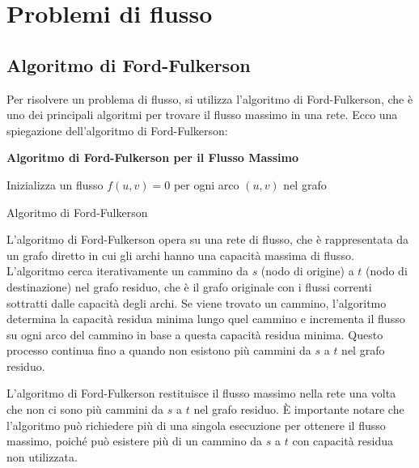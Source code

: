 \chapter{Problemi di flusso}
\section{Algoritmo di Ford-Fulkerson}

Per risolvere un problema di flusso, si utilizza l'algoritmo di Ford-Fulkerson, che è uno dei principali algoritmi per trovare il flusso massimo in una rete. Ecco una spiegazione dell'algoritmo di Ford-Fulkerson:

\textbf{Algoritmo di Ford-Fulkerson per il Flusso Massimo}

\begin{algorithm}[H]
\SetAlgoLined
{}

Inizializza un flusso $f(u, v) = 0$ per ogni arco $(u, v)$ nel grafo\;


\;
\caption{Algoritmo di Ford-Fulkerson}
\end{algorithm}

L'algoritmo di Ford-Fulkerson opera su una rete di flusso, che è rappresentata da un grafo diretto in cui gli archi hanno una capacità massima di flusso. L'algoritmo cerca iterativamente un cammino da $s$ (nodo di origine) a $t$ (nodo di destinazione) nel grafo residuo, che è il grafo originale con i flussi correnti sottratti dalle capacità degli archi. Se viene trovato un cammino, l'algoritmo determina la capacità residua minima lungo quel cammino e incrementa il flusso su ogni arco del cammino in base a questa capacità residua minima. Questo processo continua fino a quando non esistono più cammini da $s$ a $t$ nel grafo residuo.

L'algoritmo di Ford-Fulkerson restituisce il flusso massimo nella rete una volta che non ci sono più cammini da $s$ a $t$ nel grafo residuo. È importante notare che l'algoritmo può richiedere più di una singola esecuzione per ottenere il flusso massimo, poiché può esistere più di un cammino da $s$ a $t$ con capacità residua non utilizzata.


